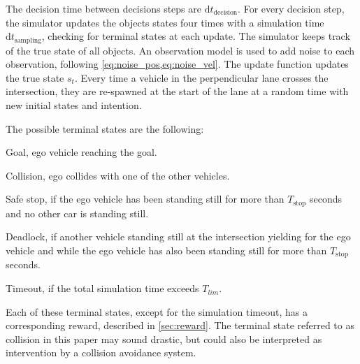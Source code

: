 The decision time between decisions steps are $\mathrm{d}t_{\text{decision}}$. For every decision step, the simulator updates the objects states four times with a simulation time $\mathrm{d}t_{\text{sampling}}$, checking for terminal states at each update. 
The simulator keeps track of the true state of all objects. An observation model is used to add noise to each observation, following \ref{eq:noise_pos,eq:noise_vel}. The update function updates the true state $s_t$. 
Every time a vehicle in the perpendicular lane crosses the intersection, they are re-spawned at the start of the lane at a random time with new initial states and intention.

The possible terminal states are the following:
\begin{enumerate*}[label=(\roman*)]
  \item Goal, ego vehicle reaching the goal.
  \item Collision, ego collides with one of the other vehicles.
  \item Safe stop, if the ego vehicle has been standing still for more than $T_\mathrm{stop}$ seconds and no other car is standing still. 
  \item Deadlock, if another vehicle standing still at the intersection yielding for the ego vehicle and while the ego vehicle has also been standing still for more than $T_\mathrm{stop}$ seconds. 
  \item Timeout, if the total simulation time exceeds $T_{lim}$. 
\end{enumerate*}
Each of these terminal states, except for the simulation timeout, has a corresponding reward, described in \ref{sec:reward}. The terminal state referred to as collision in this paper may sound drastic, but could also be interpreted as intervention by a collision avoidance system.

